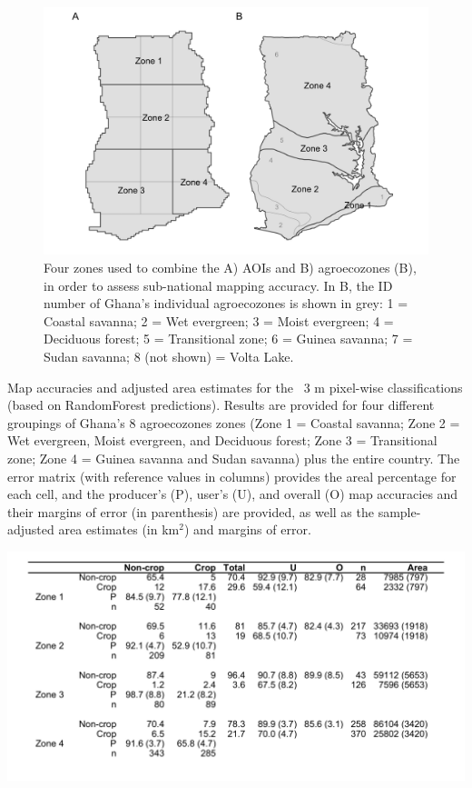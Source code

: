 \documentclass[
  11pt,
  a4paper]{article}
\begin{document}
\begin{figure}[!ht]

{\centering \includegraphics[width=0.9\linewidth,]{figures/si_aoi_zones} 

}

\caption{Four zones used to combine the A) AOIs and B) agroecozones (B), in order to assess sub-national mapping accuracy. In B, the ID number of Ghana's individual agroecozones is shown in grey: 1 = Coastal savanna; 2 = Wet evergreen; 3 = Moist evergreen; 4 = Deciduous forest; 5 = Transitional zone; 6 = Guinea savanna; 7 = Sudan savanna; 8 (not shown) = Volta Lake.}\label{fig:aoizones}
\end{figure}

\begin{table}
\caption{Map accuracies and adjusted area estimates for the ~3 m pixel-wise classifications (based on RandomForest predictions). Results are provided for four different groupings of Ghana's 8 agroecozones zones (Zone 1 = Coastal savanna; Zone 2 = Wet evergreen, Moist evergreen, and Deciduous forest; Zone 3 = Transitional zone; Zone 4 = Guinea savanna and Sudan savanna) plus the entire country. The error matrix (with reference values in columns) provides the areal percentage for each cell, and the producer's (P), user's (U), and overall (O) map accuracies and their margins of error (in parenthesis) are provided, as well as the sample-adjusted area estimates (in km$^{2}$) and margins of error.}
\begin{center}
\includegraphics[width = 16cm]{figures/si_aez_accuracies.png}
\end{center}
\label{tab:aezaccuracy}
\end{table}
\end{document}
